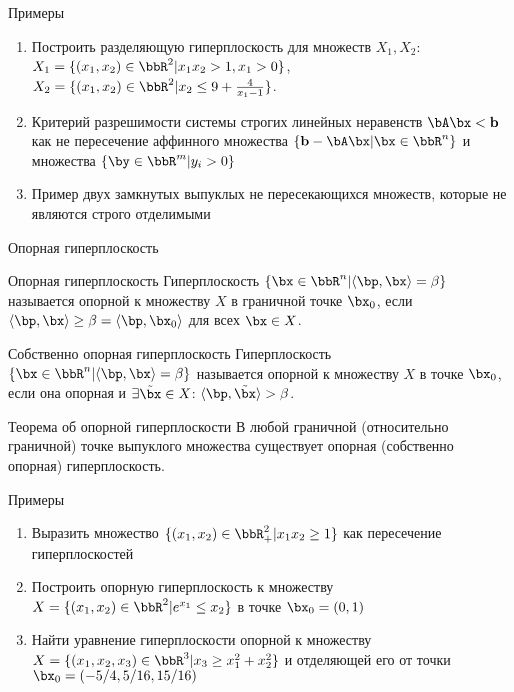 \documentclass[12pt]{beamer}
\begin{document}
\begin{frame}{Примеры}
\begin{enumerate}
\item Построить разделяющую гиперплоскость для множеств $X_1, X_2$: $X_1 = \{ (x_1, x_2) \in \bbR^2 | x_1x_2 > 1, x_1 > 0 \}$, $X_2 = \{ (x_1, x_2) \in \bbR^2 |  x_2 \leq 9 + \frac{4}{x_1 - 1} \}$.
\item Критерий разрешимости системы строгих линейных неравенств $\bA\bx < \mathbf{b}$ как не пересечение аффинного множества $\{\mathbf{b} - \bA\bx | \bx \in \bbR^n \}$ и множества $\{ \by \in \bbR^m | y_i > 0 \}$ 
\item Пример двух замкнутых выпуклых не пересекающихся множеств, которые не являются строго отделимыми
\end{enumerate}
\end{frame}

\begin{frame}{Опорная гиперплоскость}
\begin{block}{Опорная гиперплоскость}
Гиперплоскость $\{ \bx \in \bbR^n | \langle \bp, \bx \rangle = \beta \}$ называется опорной к множеству $X$ в граничной точке $\bx_0$, если $\langle \bp, \bx \rangle \geq \beta = \langle \bp, \bx_0 \rangle$ для всех $\bx \in X$.
\end{block}

\begin{block}{Собственно опорная гиперплоскость}
Гиперплоскость $\{ \bx \in \bbR^n | \langle \bp, \bx \rangle = \beta \}$ называется опорной к множеству $X$ в точке $\bx_0$, если она опорная и $\exists \tilde{\bx} \in X$: $\langle \bp, \tilde{\bx} \rangle > \beta$.
\end{block}

\begin{block}{Теорема об опорной гиперплоскости}
В любой граничной (относительно граничной) точке выпуклого множества существует опорная (собственно опорная) гиперплоскость.
\end{block}
\end{frame}


\begin{frame}{Примеры}
\begin{enumerate}
\item Выразить множество $\{ (x_1, x_2) \in \bbR_+^2| x_1x_2 \geq 1\}$ как пересечение гиперплоскостей
\item Построить опорную гиперплоскость к множеству $X = \{ (x_1, x_2) \in \bbR^2 | e^{x_1} \leq x_2 \}$ в точке $\bx_0 = (0, 1)$
\item Найти уравнение гиперплоскости опорной к множеству $X = \{ (x_1, x_2, x_3) \in \bbR^3 | x_3 \geq x_1^2 + x_2^2 \}$ и отделяющей его от точки $\bx_0 = (-5/4, 5 / 16, 15/16)$
\end{enumerate}
\end{frame}
\end{document}
